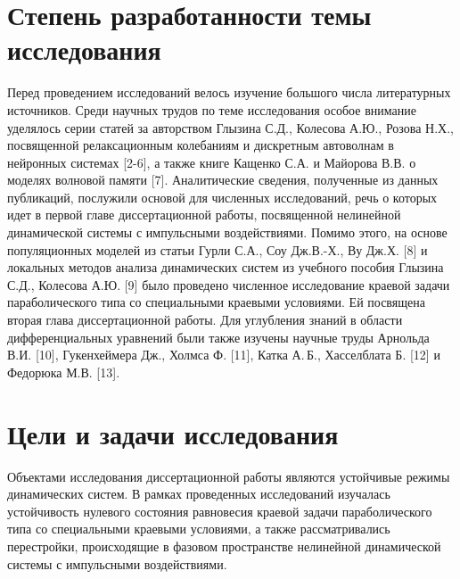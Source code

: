 \documentclass[12pt]{extarticle}
\begin{document}
\hspace{0cm}

\hspace{0cm}

\hspace{0cm}

\section*{Степень разработанности темы исследования}

\hspace{0cm}

\hspace{0cm}

\hspace{0cm}

Перед проведением исследований велось изучение большого числа литературных источников. Среди научных трудов по теме исследования особое внимание уделялось серии статей за авторством Глызина С.Д., Колесова А.Ю., Розова Н.Х., посвященной релаксационным колебаниям и дискретным автоволнам в нейронных системах [2-6], а также книге Кащенко С.А. и Майорова В.В. о моделях волновой памяти [7]. Аналитические сведения, полученные из данных публикаций, послужили основой для численных исследований, речь о которых идет в первой главе диссертационной работы, посвященной нелинейной динамической системы с импульсными воздействиями. Помимо этого, на основе популяционных моделей из статьи Гурли С.А., Соу Дж.В.-Х., Ву Дж.Х. [8] и локальных методов анализа динамических систем из учебного пособия Глызина С.Д., Колесова А.Ю. [9] было проведено численное исследование краевой задачи параболического типа со специальными краевыми условиями. Ей посвящена вторая глава диссертационной работы. Для углубления знаний в области дифференциальных уравнений были также изучены научные труды Арнольда В.И. [10], Гукенхеймера Дж., Холмса Ф. [11], Катка А.\,Б., Хасселблата Б. [12] и Федорюка М.В. [13].

\section*{Цели и задачи исследования}

\hspace{0cm}

\hspace{0cm}

\hspace{0cm}

Объектами исследования диссертационной работы являются устойчивые режимы динамических систем. В рамках проведенных исследований изучалась устойчивость нулевого состояния равновесия краевой задачи параболического типа со специальными краевыми условиями, а также рассматривались перестройки, происходящие в фазовом пространстве нелинейной динамической системы с импульсными воздействиями.
\end{document}
